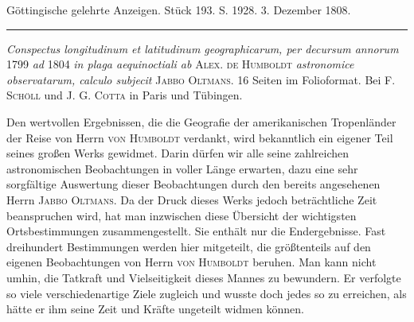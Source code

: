 \clearpage
{}
\hypertarget{native-514-lower}{}\label{native-514-lower}
\begin{center}\small Göttingische gelehrte Anzeigen. Stück 193. S. 1928. 3. Dezember 1808.\\[3pt]\rule{.72\linewidth}{.3pt}\end{center}

\emph{Conspectus longitudinum et latitudinum geographicarum, per decursum annorum} 1799 \emph{ad} 1804 \emph{in plaga aequinoctiali ab} \textsc{Alex. de Humboldt} \emph{astronomice observatarum, calculo subjecit} \textsc{Jabbo Oltmans}. 16 Seiten im Folioformat. Bei \textsc{F. Schöll} und \textsc{J. G. Cotta} in Paris und Tübingen.

Den wertvollen Ergebnissen, die die Geografie der amerikanischen Tropenländer der Reise von Herrn \textsc{von Humboldt} verdankt, wird bekanntlich ein eigener Teil seines großen Werks gewidmet. Darin dürfen wir alle seine zahlreichen astronomischen Beobachtungen in voller Länge erwarten, dazu eine sehr sorgfältige Auswertung dieser Beobachtungen durch den bereits angesehenen Herrn \textsc{Jabbo Oltmans}. Da der Druck dieses Werks jedoch beträchtliche Zeit beanspruchen wird, hat man inzwischen diese Übersicht der wichtigsten Ortsbestimmungen zusammengestellt. Sie enthält nur die Endergebnisse. Fast dreihundert Bestimmungen werden hier mitgeteilt, die größtenteils auf den eigenen Beobachtungen von Herrn \textsc{von Humboldt} beruhen. Man kann nicht umhin, die Tatkraft und Vielseitigkeit dieses Mannes zu bewundern. Er verfolgte so viele verschiedenartige Ziele zugleich und wusste doch jedes so zu erreichen, als hätte er ihm seine Zeit und Kräfte ungeteilt widmen können.
